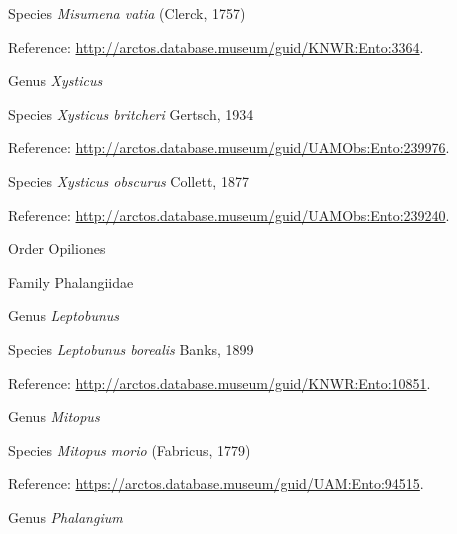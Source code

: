 \documentclass[9pt, article]{memoir}
\begin{document}
\begin{multicols}{2}
\vspace{6pt}\noindent\hspace{36pt}Species \textit{Misumena vatia} (Clerck, 1757)


Reference: 
\url{http://arctos.database.museum/guid/KNWR:Ento:3364}.

\vspace{6pt}\noindent\hspace{30pt}Genus \textit{Xysticus}


\vspace{6pt}\noindent\hspace{36pt}Species \textit{Xysticus britcheri} Gertsch, 1934


Reference: 
\url{http://arctos.database.museum/guid/UAMObs:Ento:239976}.

\vspace{6pt}\noindent\hspace{36pt}Species \textit{Xysticus obscurus} Collett, 1877


Reference: 
\url{http://arctos.database.museum/guid/UAMObs:Ento:239240}.

\vspace{6pt}\noindent\hspace{18pt}Order Opiliones


\vspace{6pt}\noindent\hspace{24pt}Family Phalangiidae


\vspace{6pt}\noindent\hspace{30pt}Genus \textit{Leptobunus}


\vspace{6pt}\noindent\hspace{36pt}Species \textit{Leptobunus borealis} Banks, 1899


Reference: 
\url{http://arctos.database.museum/guid/KNWR:Ento:10851}.

\vspace{6pt}\noindent\hspace{30pt}Genus \textit{Mitopus}


\vspace{6pt}\noindent\hspace{36pt}Species \textit{Mitopus morio} (Fabricus, 1779)


Reference: 
\url{https://arctos.database.museum/guid/UAM:Ento:94515}.

\vspace{6pt}\noindent\hspace{30pt}Genus \textit{Phalangium}



\end{multicols}
\end{document}
